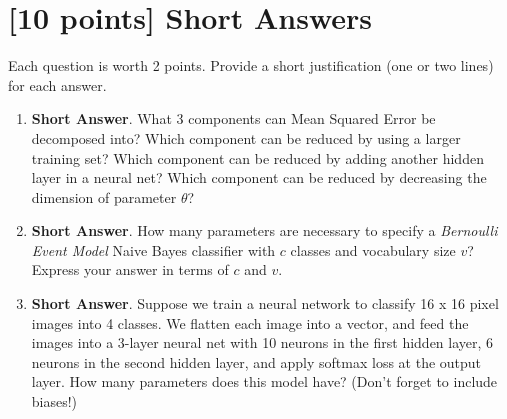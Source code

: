 \documentclass{article}
\newif\ifsolutions
\newenvironment{labelledanswer}{{\bf Answer:} \sf }{}%
\newcommand{\answer}[2]
{{
\ifsolutions
\begin{labelledanswer}
\color{red} 
#2
\end{labelledanswer}
\else
#1
\fi
}}
\begin{document}
\clearpage

\section{[10 points] Short Answers}

Each question is worth 2 points. Provide a short justification (one or two lines) for each answer.

\begin{enumerate}

\item \textbf{Short Answer}. 
What 3 components can Mean Squared Error be decomposed into? Which component can be reduced by using a larger training set? Which component can be reduced by adding another hidden layer in a neural net? Which component can be reduced by decreasing the dimension of parameter $\theta$?

\answer{}{
MSE =  Irreducible Error+ Bias$^2$ + Variance\\

Which component can be reduced by using a larger training set? Variance. This leads to the model potentially reduce the gap between cross-validation error and training error through learning from more examples.  \\
Which component can be reduced by adding another hidden layer in a neural net?  Bias. The model is now bigger and more complicated, leading it to learn more pontentially from its current set of features. Training error might be lower, indicating lower bias.\\
Which component can be reduced by decreasing the dimension of parameter $\theta$? This action would means that the parameter would have less expressive power. Depending on the data, this might cause it to perform worse on training error. An example if we're reducing parameters to 1 dimension, but we're predicting data that's much better expressed in 3 dimensions. Therefore, this seems to increase bias which might result in increase in variance. \\
}

\item \textbf{Short Answer}. 
How many parameters are necessary to specify a \emph{Bernoulli Event Model} Naive Bayes classifier with $c$ classes and vocabulary size $v$? Express your answer in terms of $c$ and $v$.

\answer{}{We would need $v\times c$ parameters in total.}

\item \textbf{Short Answer}.
Suppose we train a neural network to classify 16 x 16 pixel images into 4 classes. We flatten each image into a vector, and feed the images into a 3-layer neural net with 10 neurons in the first hidden layer, 6 neurons in the second hidden layer, and apply softmax loss at the output layer. How many parameters does this model have? (Don't forget to include biases!)


\end{enumerate}
\end{document}
